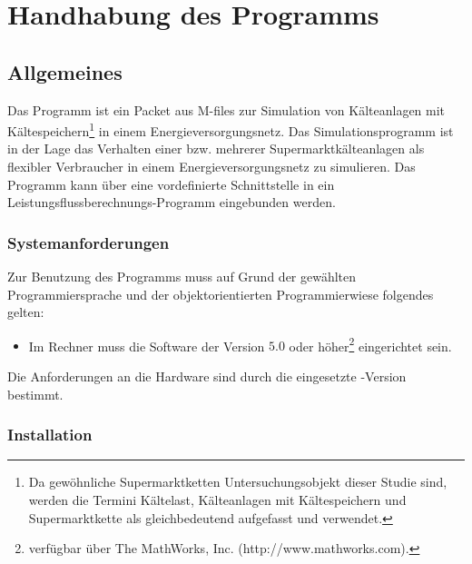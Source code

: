 \chapter{Handhabung des Programms}
\label{chap:handhabung}
\minitoc

\section{Allgemeines}

Das Programm ist ein Packet aus \matlab M-files zur Simulation von Kälteanlagen mit Kältespeichern\footnote{ Da gewöhnliche
Supermarktketten Untersuchungsobjekt dieser Studie sind, werden die Termini Kältelast, Kälteanlagen mit Kältespeichern und
Supermarktkette als gleichbedeutend aufgefasst und verwendet.} in einem Energieversorgungsnetz. Das Simulationsprogramm ist
in der Lage das Verhalten einer bzw. mehrerer Supermarktkälteanlagen als flexibler Verbraucher in einem
Energieversorgungsnetz zu simulieren. Das Programm kann über eine vordefinierte Schnittstelle in ein
Leistungsflussberechnungs-Programm eingebunden werden.

\subsection{Systemanforderungen}

Zur Benutzung des Programms muss auf Grund der gewählten Programmiersprache und der objektorientierten Programmierwiese
folgendes gelten:

\begin{itemize}
	\item Im Rechner muss die Software \matlab der Version $5.0$ oder höher\footnote{ \matlab verfügbar über The
		MathWorks, Inc.  (http://www.mathworks.com).} eingerichtet sein.
\end{itemize}

Die Anforderungen an die Hardware sind durch die eingesetzte \matlab-Version bestimmt.

\subsection{Installation}

